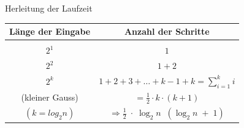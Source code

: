 \documentclass[ucs,9pt]{beamer}
\begin{document}
\begin{frame}{Herleitung der Laufzeit}
\begin{center}
\begin{tabular}{c|c}
Länge der Eingabe & Anzahl der Schritte \\
\hline \\
 {$2^1$} &  { $1$}\\
 {$2^2$} &  { $1 + 2$}\\
 {$2^k$}&  { $1 + 2 + 3 + … + k-1 + k  = \sum_{i=1}^k i$}\\
 {{\color{gray}(kleiner Gauss)}} &  {$ =\frac{1}{2}\cdot k \cdot (k+1) $} \\
 {{\color{gray}$(k = log_2 n)$}} & {$\Rightarrow \frac{1}{2}\; \cdot\;\log_2 n \;\; (\log_2 n\;+\;1)$} \\
\end{tabular}
\end{center}
\end{frame}

\end{document}
